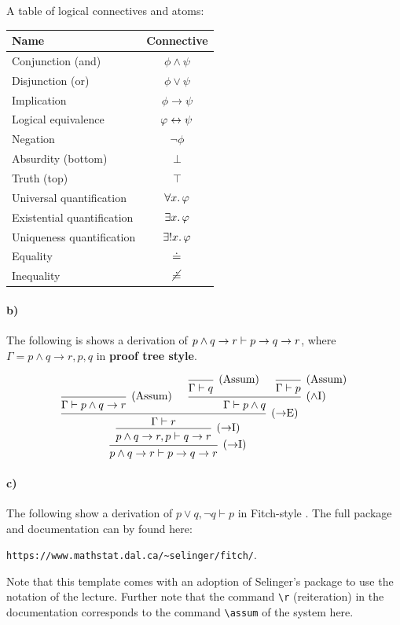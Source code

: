 \documentclass{article}
\begin{document}
A table of logical connectives and atoms:
\begin{center}
  \begin{tabular}{l|c}
    Name & Connective \\\hline
    Conjunction (and) & $\phi \land \psi$ \\
    Disjunction (or) & $\phi \lor \psi $ \\
    Implication & $\phi \to \psi $ \\
    Logical equivalence & $\varphi \leftrightarrow \psi $ \\
    Negation & $\neg \phi$ \\
    Absurdity (bottom) & $\bot$ \\
    Truth (top) & $\top$ \\
    Universal quantification & $\forall x. \, \varphi$ \\
    Existential quantification & $\exist{x} \phi$ \\
    Uniqueness quantification & $\exist1{x} \phi$ \\
    Equality & $\doteq$ \\
    Inequality & $\cancel{\doteq}$
  \end{tabular}
\end{center}


\paragraph{b)}
The following is shows a derivation of $\seq{p \land q \to r}{p \to q \to r}$,
where $\Gamma = p \land q \to r, p, q$ in \textbf{proof tree style}.
\begin{equation*}
  \begin{prooftree}
    \infer0{}
    \infer1[\Ax]{\Gamma \vdash p \land q \to r}
    \infer0{}
    \infer1[\Ax]{\Gamma \vdash q}
    \infer0{}
    \infer1[\Ax]{\Gamma \vdash p}
    \infer2[\IAnd]{\Gamma \vdash p \land q}
    \infer2[\EImpl]{\Gamma \vdash r}
    \infer1[\IImpl]{p \land q \to r, p \vdash q \to r}
    \infer1[\IImpl]{p \land q \to r \vdash p \to q \to r}
  \end{prooftree}
\end{equation*}

\paragraph{c)}
The following show a derivation of $p \lor q, \neg q \vdash p$ in
Fitch-style \ND{}.
The full package and documentation can by found here:
\begin{center}
\texttt{https://www.mathstat.dal.ca/\textasciitilde selinger/fitch/}.
\end{center}
Note that this template comes with an adoption of Selinger's package to use
the notation of the lecture.
Further note that the command \texttt{\textbackslash{}r} (reiteration) in the
documentation corresponds to the command \texttt{\textbackslash{}assum} of
the system \ND{} here.
\end{document}
